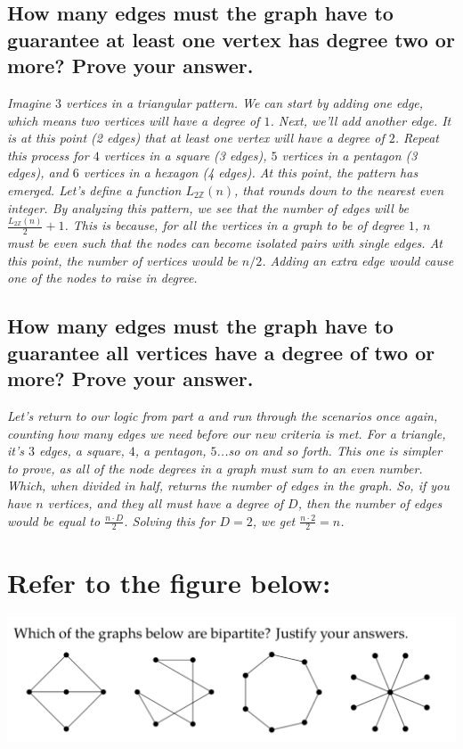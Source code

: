 \documentclass{article}
\begin{document}
\subsection{How many edges must the graph have to guarantee at least one vertex has degree
    two or more? Prove your answer.}
\hspace{1cm}\textit{Imagine $3$ vertices in a triangular pattern. We can start by adding one
    edge, which means two vertices will have a degree of $1$. Next, we'll add another edge. It
    is at this point (2 edges) that at least one vertex will have a degree of $2$. Repeat this process for
    $4$ vertices in a square (3 edges), $5$ vertices in a pentagon (3 edges), and $6$ vertices in
    a hexagon (4 edges). At this point, the pattern has emerged. Let's define a function $L_{2\mathbb{Z}}(n)$,
    that rounds down to the nearest even integer. By analyzing this pattern, we see that the number of edges
    will be $\frac{L_{2\mathbb{Z}}(n)}{2}+1$. This is because, for all the vertices in a graph to be of degree $1$,
    $n$ must be even such that the nodes can become isolated pairs with single edges. At this point, the number of
    vertices would be $n/2$. Adding an extra edge would cause one of the nodes to raise in degree.}
\subsection{How many edges must the graph have to guarantee all vertices have a degree of
    two or more? Prove your answer.}
\hspace{1cm}\textit{Let's return to our logic from part a and run through the scenarios once again,
    counting how many edges we need before our new criteria is met. For a triangle, it's $3$ edges,
    a square, $4$, a pentagon, $5$...so on and so forth. This one is simpler to prove, as all of the
    node degrees in a graph must sum to an even number. Which, when divided in half, returns the number
    of edges in the graph. So, if you have $n$ vertices, and they all must have a degree of $D$, then the
    number of edges would be equal to $\frac{n\cdot D}{2}$. Solving this for $D=2$, we get $\frac{n\cdot 2}{2} = n$.}
\clearpage


\section{Refer to the figure below:}
\includegraphics[scale=0.66]{assignment5-problem6.png}
\end{document}
